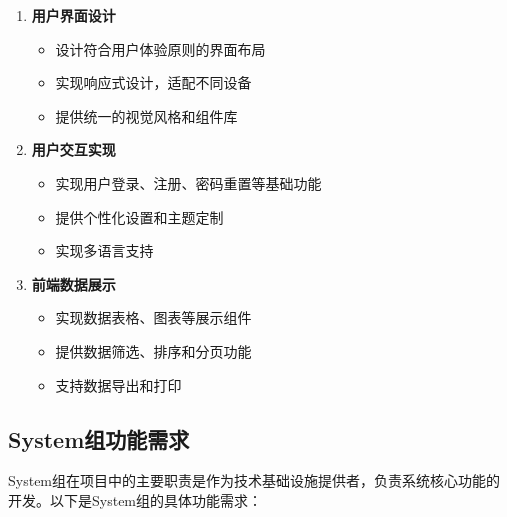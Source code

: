 \documentclass[a4paper,12pt]{article}
\begin{document}
\begin{enumerate}
  \item \textbf{用户界面设计}
  \begin{itemize}
    \item 设计符合用户体验原则的界面布局
    \item 实现响应式设计，适配不同设备
    \item 提供统一的视觉风格和组件库
  \end{itemize}
  
  \item \textbf{用户交互实现}
  \begin{itemize}
    \item 实现用户登录、注册、密码重置等基础功能
    \item 提供个性化设置和主题定制
    \item 实现多语言支持
  \end{itemize}
  
  \item \textbf{前端数据展示}
  \begin{itemize}
    \item 实现数据表格、图表等展示组件
    \item 提供数据筛选、排序和分页功能
    \item 支持数据导出和打印
  \end{itemize}
\end{enumerate}

\subsection{System组功能需求}

System组在项目中的主要职责是作为技术基础设施提供者，负责系统核心功能的开发。以下是System组的具体功能需求：
\end{document}
